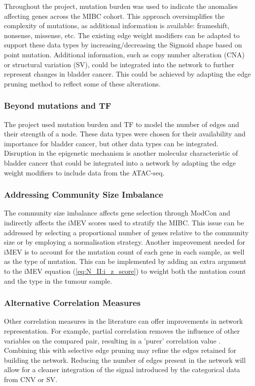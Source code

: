 Throughout the project, mutation burden was used to indicate the anomalies affecting genes across the MIBC cohort. This approach oversimplifies the complexity of mutations, as additional information is available: frameshift, nonsense, missense, etc. The existing edge weight modifiers can be adapted to support these data types by increasing/decreasing the Sigmoid shape based on point mutation. Additional information, such as copy number alteration (CNA) or structural variation (SV), could be integrated into the network to further represent changes in bladder cancer. This could be achieved by adapting the edge pruning method to reflect some of these alterations.

\subsubsection*{Beyond mutations and TF}

The project used mutation burden and TF to model the number of edges and their strength of a node. These data types were chosen for their availability and importance for bladder cancer, but other data types can be integrated. Disruption in the epigenetic mechanism is another molecular characteristic of bladder cancer \citep{Robertson2017-mg,Tcga2014-dr} that could be integrated into a network by adapting the edge weight modifiers to include data from the ATAC-seq.


\subsubsection*{Addressing Community Size Imbalance}

The community size imbalance affects gene selection through ModCon and indirectly affects the iMEV scores used to stratify the MIBC. This issue can be addressed by selecting a proportional number of genes relative to the community size or by employing a normalisation strategy. Another improvement needed for iMEV is to account for the mutation count of each gene in each sample, as well as the type of mutation. This can be implemented by adding an extra argument to the iMEV equation (\cref{eq:N_II:i_z_score}) to weight both the mutation count and the type in the tumour sample.


\subsubsection*{Alternative Correlation Measures}

Other correlation measures in the literature can offer improvements in network representation. For example, partial correlation removes the influence of other variables on the compared pair, resulting in a 'purer' correlation value \citep{De_la_Fuente2004-ts}. Combining this with selective edge pruning may refine the edges retained for building the network. Reducing the number of edges present in the network will allow for a cleaner integration of the signal introduced by the categorical data from CNV or SV.

